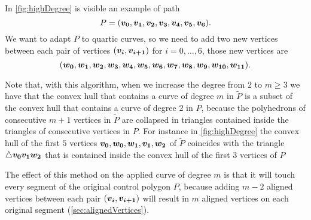 \documentclass[dissertation.tex]{subfiles}
\begin{document}
In \cref{fig:highDegree} is visible an example of path
\begin{equation*}
  P=(\boldsymbol{v_0},\boldsymbol{v_1},\boldsymbol{v_2},\boldsymbol{v_3},\boldsymbol{v_4},\boldsymbol{v_5},\boldsymbol{v_6}).
\end{equation*}
We want to adapt $P$ to quartic \bs curves, so we need to add two new
vertices between each pair of vertices $(\boldsymbol{v_i},\boldsymbol{v_{i+1}})$ for
$i=0,\dots,6$, those new vertices are
\begin{equation*}
  (\boldsymbol{w_0},\boldsymbol{w_1},\boldsymbol{w_2},\boldsymbol{w_3},\boldsymbol{w_4},\boldsymbol{w_5},\boldsymbol{w_6},\boldsymbol{w_7},\boldsymbol{w_8},\boldsymbol{w_9},\boldsymbol{w_{10}},\boldsymbol{w_{11}}).
\end{equation*}

Note that, with this algorithm, when we increase the degree from $2$
to $m\ge 3$ we have that the convex hull that contains a \bs curve of
degree $m$ in
$\tilde{P}$ is a subset of the convex hull that contains a \bs curve
of degree $2$
in $P$, because the polyhedrons of consecutive $m+1$ vertices in
$\tilde{P}$ are collapsed in triangles contained inside the triangles
of consecutive vertices in $P$. For instance in \cref{fig:highDegree}
the convex hull of the first $5$ vertices
$\boldsymbol{v_0},\boldsymbol{w_0},\boldsymbol{w_1},\boldsymbol{v_1},\boldsymbol{w_2}$ of $\tilde{P}$
coincides with the
triangle $\triangle \boldsymbol{v_0}\boldsymbol{v_1}\boldsymbol{w_2}$ that is contained inside
the convex hull of the first $3$ vertices of $P$

The effect of this method on the applied curve of degree $m$ is that
it will touch
every segment of the original control polygon $P$, because adding
$m-2$ aligned vertices between each pair $(\boldsymbol{v_i},\boldsymbol{v_{i+1}})$
will result in $m$ aligned vertices on each original segment (\cref{sec:alignedVertices}).
\end{document}
